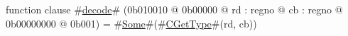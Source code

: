 function clause #\hyperref[zdecode]{decode}# (0b010010 @ 0b00000 @ rd : regno @ cb : regno @ 0b00000000 @ 0b001) = #\hyperref[zSome]{Some}#(#\hyperref[zCGetType]{CGetType}#(rd, cb))
